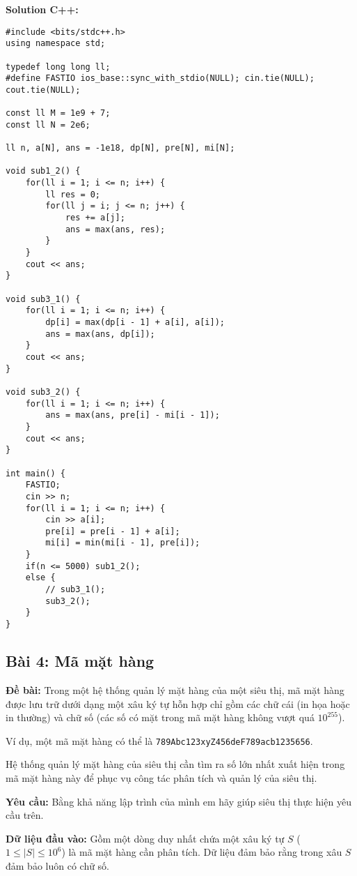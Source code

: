 \documentclass[12pt]{scrartcl}  %
\begin{document}
\textbf{Solution C++:}
\begin{lstlisting}
#include <bits/stdc++.h>
using namespace std;

typedef long long ll;
#define FASTIO ios_base::sync_with_stdio(NULL); cin.tie(NULL); cout.tie(NULL);

const ll M = 1e9 + 7;
const ll N = 2e6;

ll n, a[N], ans = -1e18, dp[N], pre[N], mi[N];

void sub1_2() {
    for(ll i = 1; i <= n; i++) {
        ll res = 0;
        for(ll j = i; j <= n; j++) {
            res += a[j];
            ans = max(ans, res);
        }
    }
    cout << ans;
}

void sub3_1() {
    for(ll i = 1; i <= n; i++) {
        dp[i] = max(dp[i - 1] + a[i], a[i]);
        ans = max(ans, dp[i]);
    }
    cout << ans;
}

void sub3_2() {
    for(ll i = 1; i <= n; i++) {
        ans = max(ans, pre[i] - mi[i - 1]);
    }
    cout << ans;
}

int main() {
    FASTIO;
    cin >> n;
    for(ll i = 1; i <= n; i++) {
        cin >> a[i];
        pre[i] = pre[i - 1] + a[i];
        mi[i] = min(mi[i - 1], pre[i]);
    }
    if(n <= 5000) sub1_2();
    else {
        // sub3_1();
        sub3_2();
    }
}

\end{lstlisting}

\subsection{Bài 4: Mã mặt hàng}

\textbf{Đề bài:}
Trong một hệ thống quản lý mặt hàng của một siêu thị, mã mặt hàng được lưu trữ dưới dạng một xâu ký tự hỗn hợp chỉ gồm các chữ cái (in họa hoặc in thường) và 
chữ số (các số có mặt trong mã mặt hàng không vượt quá $10^{255}$). 

Ví dụ, một mã mặt hàng có thể là \texttt{789Abc123xyZ456deF789acb1235656}.

Hệ thống quản lý mặt hàng của siêu thị cần tìm ra số lớn nhất xuất hiện trong mã mặt hàng này để phục vụ công tác phân tích và quản lý của siêu thị.

\textbf{Yêu cầu:}
Bằng khả năng lập trình của mình em hãy giúp siêu thị thực hiện yêu cầu trên. 

\textbf{Dữ liệu đầu vào:}
Gồm một dòng duy nhất chứa một xâu ký tự $S$ ($1 \leq |S| \leq 10^6$) là mã mặt hàng cần phân tích. Dữ liệu đảm bảo rằng trong xâu $S$ đảm bảo luôn có chữ số. 
\end{document}
